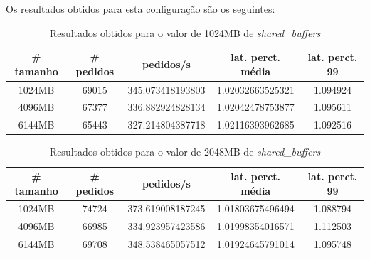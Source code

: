 Os resultados obtidos para esta configuração são os seguintes:

\begin{table}[!h]
\center
\small
\begin{tabular}{|c|c|c|c|c|}
\hline
\textbf{\# tamanho} & \textbf{\# pedidos} & \textbf{pedidos/s} & \textbf{lat. perct. média} & \textbf{lat. perct. 99}  \\ \hline
1024MB & 69015 & 345.073418193803 & 1.02032663525321 & 1.094924  \\ \hline
4096MB & 67377 & 336.882924828134 & 1.02042478753877 & 1.095611  \\ \hline
6144MB & 65443 & 327.214804387718 & 1.02116393962685 & 1.092516  \\ \hline
\end{tabular}
\caption{Resultados obtidos para o valor de 1024MB de \textit{shared\_buffers}}
\end{table}

\begin{table}[!h]
\center
\small
\begin{tabular}{|c|c|c|c|c|}
\hline
\textbf{\# tamanho} & \textbf{\# pedidos} & \textbf{pedidos/s} & \textbf{lat. perct. média} & \textbf{lat. perct. 99}  \\ \hline
1024MB & 74724 & 373.619008187245 & 1.01803675496494 & 1.088794  \\ \hline
4096MB & 66985 & 334.923957423586 & 1.01998354016571 & 1.112503  \\ \hline
6144MB & 69708 & 348.538465057512 & 1.01924645791014 & 1.095748  \\ \hline
\end{tabular}
\caption{Resultados obtidos para o valor de 2048MB de \textit{shared\_buffers}}
\end{table}

